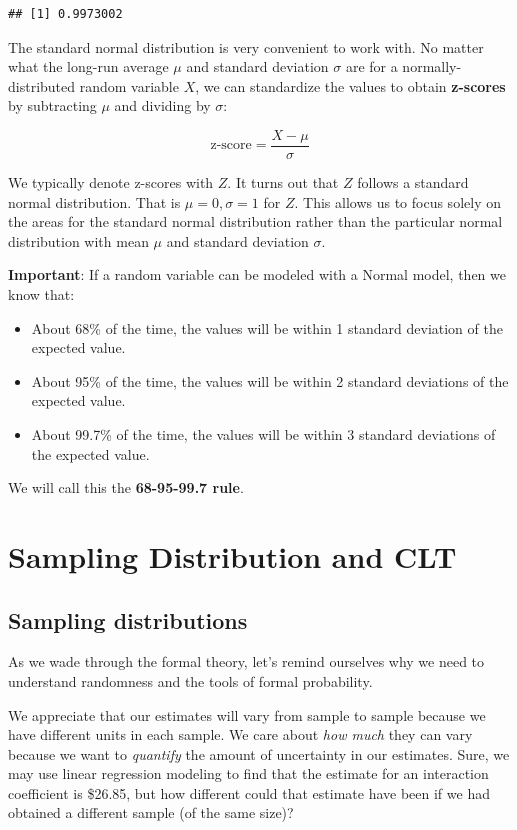 \documentclass[
]{book}
\providecommand{\tightlist}{%
  \setlength{\itemsep}{0pt}\setlength{\parskip}{0pt}}
\begin{document}
\begin{verbatim}
## [1] 0.9973002
\end{verbatim}

The standard normal distribution is very convenient to work with. No matter what the long-run average \(\mu\) and standard deviation \(\sigma\) are for a normally-distributed random variable \(X\), we can standardize the values to obtain \textbf{z-scores} by subtracting \(\mu\) and dividing by \(\sigma\):

\[\text{z-score} = \frac{X - \mu}{\sigma}\]

We typically denote z-scores with \(Z\). It turns out that \(Z\) follows a standard normal distribution. That is \(\mu=0, \sigma=1\) for \(Z\). This allows us to focus solely on the areas for the standard normal distribution rather than the particular normal distribution with mean \(\mu\) and standard deviation \(\sigma\).

\textbf{Important}: If a random variable can be modeled with a Normal model, then we know that:

\begin{itemize}
\tightlist
\item
  About 68\% of the time, the values will be within 1 standard deviation of the expected value.
\item
  About 95\% of the time, the values will be within 2 standard deviations of the expected value.
\item
  About 99.7\% of the time, the values will be within 3 standard deviations of the expected value.
\end{itemize}

We will call this the \textbf{68-95-99.7 rule}.

\hypertarget{sampling-distribution-and-clt}{%
\section{Sampling Distribution and CLT}\label{sampling-distribution-and-clt}}

\hypertarget{sampling-distributions}{%
\subsection{Sampling distributions}\label{sampling-distributions}}

As we wade through the formal theory, let's remind ourselves why we need to understand randomness and the tools of formal probability.

We appreciate that our estimates will vary from sample to sample because we have different units in each sample. We care about \emph{how much} they can vary because we want to \emph{quantify} the amount of uncertainty in our estimates. Sure, we may use linear regression modeling to find that the estimate for an interaction coefficient is \$26.85, but how different could that estimate have been if we had obtained a different sample (of the same size)?
\end{document}

